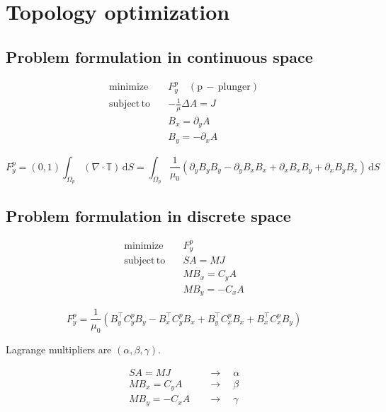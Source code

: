 \newpage
\chapter{Topology optimization}

\section{Problem formulation in continuous space}

\begin{align*} 
\mathrm{minimize}\quad  &  F_y^p \quad \mathrm{(p\,-\,plunger)} \\
\mathrm{subject \, to}\quad  & - \frac{1}{\mu} \Delta A = J \\
&  B_x = \partial_y A \\
&  B_y = - \partial_x A
\end{align*}

\begin{equation} \label{eq:43} 
F_y^p = \left(0,1\right) \int_{\Omega_p} \left( \nabla \cdot \mathbb{T} \right) \,\mathrm{d}S = \int_{\Omega_p} \frac{1}{\mu_0} \left( \partial_y B_y B_y - \partial_y B_x B_x + \partial_x B_x B_y + \partial_x B_y B_x \right) \,\mathrm{d}S
\end{equation}

\section{Problem formulation in discrete space}

\begin{align*} 
\mathrm{minimize}\quad  &  F_y^p \\
\mathrm{subject \, to}\quad  &  S A = M J \\
&  M B_x = C_y A \\
&  M B_y = -C_x A 
\end{align*}


\begin{equation} \label{eq:44} 
F_y^p = \frac{1}{\mu_0} \left(B_y^{\top} C_y^p B_y - B_x^{\top} C_y^p B_x + B_y^{\top} C_x^p B_x + B_x^{\top} C_x^p B_y \right)
\end{equation}

\noindent Lagrange multipliers are $\left(\alpha, \beta, \gamma \right)$.

\begin{align*} 
S A = M J \quad &\rightarrow \quad \alpha \\
M B_x = C_y A \quad &\rightarrow \quad \beta \\
M B_y = -C_x A \quad &\rightarrow \quad \gamma \\
\end{align*}

